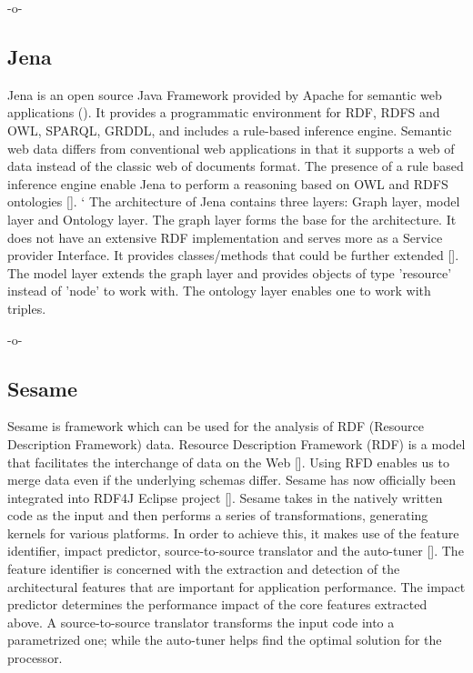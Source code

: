      -o-

\subsection{Jena }

Jena is an open source Java Framework provided by Apache for semantic
web applications (\cite{www-w3-jena}). It provides a programmatic
environment for RDF, RDFS and OWL, SPARQL, GRDDL, and includes a
rule-based inference engine. Semantic web data differs from
conventional web applications in that it supports a web of data
instead of the classic web of documents format. The presence of a rule
based inference engine enable Jena to perform a reasoning based on OWL
and RDFS ontologies [\cite{www-trimc-nlp-blogspot}]. ` The architecture
of Jena contains three layers: Graph layer, model layer and Ontology
layer. The graph layer forms the base for the architecture. It does
not have an extensive RDF implementation and serves more as a Service
provider Interface. It provides classes/methods that could be further
extended [\cite{www-trimc-nlp-blogspot}].  The model layer extends the
graph layer and provides objects of type 'resource' instead of 'node'
to work with.  The ontology layer enables one to work with triples.

     -o-

\subsection{Sesame}

Sesame is framework which can be used for the analysis of RDF
(Resource Description Framework) data.  Resource Description Framework
(RDF) is a model that facilitates the interchange of data on the
Web [\cite{www-RDF}].  Using RFD enables us to merge data even if the
underlying schemas differ.  Sesame has now officially been integrated
into RDF4J Eclipse project [\cite{www-sesame}].  Sesame takes in the
natively written code as the input and then performs a series of
transformations, generating kernels for various platforms.  In order
to achieve this, it makes use of the feature identifier, impact
predictor, source-to-source translator and the
auto-tuner [\cite{sesame-paper-2013}].  The feature identifier is
concerned with the extraction and detection of the architectural
features that are important for application performance.  The impact
predictor determines the performance impact of the core features
extracted above.  A source-to-source translator transforms the input
code into a parametrized one; while the auto-tuner helps find the
optimal solution for the processor.

